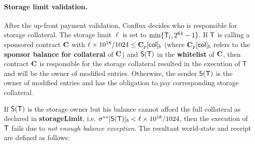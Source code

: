 %



\paragraph{Storage limit validation.}

After the up-front payment validation, Conflux decides who is responsible for storage collateral. The storage limit $\ell$ is set to $\min\{\textsf{T}_l,2^{64}-1\}$.
%
If $\textsf{T}$ is calling a sponsored contract $\mathbf{C}$ with $\ell\times 10^{18}/1024 \le \mathbf{C}_p[{\sf col}]_b$ (where $\mathbf{C}_p[{\sf col}]_b$ refers to the \textbf{sponsor balance for collateral} of $\mathbf{C}$) and $\mathsf{S}{\left({\textsf{T}} \right)}$ in the \textbf{whitelist} of $\mathbf{C}$, then contract $\mathbf{C}$ is responsible for the storage collateral resulted in the execution of $\textsf{T}$ and will be the owner of modified entries. 
%
Otherwise, the sender $\mathsf{S}{\left({\textsf{T}} \right)}$ is the owner of modified entries
and has the obligation to pay corresponding storage collateral.

If $\mathsf{S}{\left({\textsf{T}} \right)}$ is the storage owner but his balance cannot afford the full collateral as declared in {\bf storageLimit}, 
i.e. $\mathbf{\sigma}^{**}[\mathsf{S}{\left({\textsf{T}} \right)}]_b<\ell\times 10^{18}/1024$, 
then the execution of $\textsf{T}$ fails due to \emph{not enough balance exception}. The resultant world-state and receipt are defined as follows:

